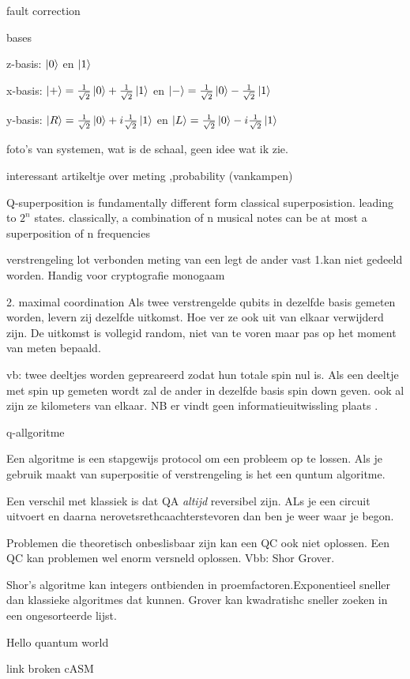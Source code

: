 \documentclass[../../main.tex]{subfiles}
\begin{document}
fault correction

bases

z-basis:
$\ket{0}$ en $\ket{1}$

x-basis:
$\ket{+}=\tfrac{1}{\sqrt{2}}\ket{0}+\tfrac{1}{\sqrt{2}}\ket{1}$ en $\ket{-}=\tfrac{1}{\sqrt{2}}\ket{0}-\tfrac{1}{\sqrt{2}}\ket{1}$

y-basis:
$\ket{R}=\tfrac{1}{\sqrt{2}}\ket{0}+i\tfrac{1}{\sqrt{2}}\ket{1}$ en $\ket{L}=\tfrac{1}{\sqrt{2}}\ket{0}-i\tfrac{1}{\sqrt{2}}\ket{1}$

foto's van systemen, wat is de schaal, geen idee wat ik zie.

interessant artikeltje over meting ,probability (vankampen)
\cite{vankampen2008scandal}

Q-superposition is fundamentally different form classical superposistion. leading to $2^n$ states. classically, a combination of n musical notes can be at most a superposition of n frequencies

verstrengeling 
lot verbonden meting van een legt de ander vast
1.kan niet gedeeld worden. Handig voor cryptografie
monogaam

2. maximal coordination Als twee verstrengelde qubits in dezelfde basis gemeten worden, levern zij dezelfde uitkomst. Hoe ver ze ook uit van elkaar verwijderd zijn. De uitkomst is vollegid random, niet van te voren maar pas op het moment van meten bepaald.


vb: twee deeltjes worden gepreareerd zodat hun totale spin nul is.
Als een deeltje met spin up gemeten wordt zal de ander in dezelfde basis spin down geven. ook al zijn ze kilometers van elkaar. 
NB er vindt geen informatieuitwissling plaats  .

q-allgoritme

Een algoritme is een stapgewijs protocol om een probleem op te lossen.  Als je gebruik maakt van superpositie of verstrengeling is het een quntum algoritme. 


Een verschil met klassiek is dat QA \textit{altijd} reversibel zijn. ALs je een circuit uitvoert en daarna nerovetsrethcaachterstevoren dan ben je weer waar je begon.


Problemen die theoretisch onbeslisbaar zijn kan een QC ook niet oplossen. Een QC kan problemen wel enorm versneld oplossen. Vbb: Shor Grover.

Shor's algoritme kan integers ontbienden in proemfactoren.Exponentieel sneller dan klassieke algoritmes dat kunnen. Grover kan kwadratishc sneller zoeken in een ongesorteerde lijst.

Hello quantum world

link broken cASM
\end{document}
